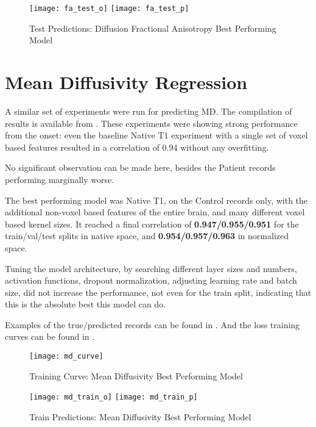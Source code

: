 \begin{figure}[H]
\centering
\texttt{[image: fa\_test\_o]}
\texttt{[image: fa\_test\_p]}
\caption{Test Predictions: Diffusion Fractional Anisotropy Best Performing Model}
\label{fig:pred-tes-fa}
\end{figure}

\section{Mean Diffusivity Regression}

A similar set of experiments were run for predicting \ac{MD}. The compilation of results is available from  . These experiments were showing strong performance from the onset: even the baseline Native T1 experiment with a single set of voxel based features resulted in a correlation of 0.94 without any overfitting.\par
No significant observation can be made here, besides the Patient records performing marginally worse.\par
The best performing model was Native T1, on the Control records only, with the additional non-voxel based features of the entire brain, and many different voxel based kernel sizes. It reached a final correlation of \textbf{0.947/0.955/0.951} for the train/val/test splits in native space, and \textbf{0.954/0.957/0.963} in normalized space.\par
Tuning the model architecture, by searching different layer sizes and numbers, activation functions, dropout normalization, adjusting learning rate and batch size, did not increase the performance, not even for the train split, indicating that this is the absolute best this model can do.\par
Examples of the true/predicted records can be found in  . And the loss training curves can be found in .

\begin{figure}[H]
\centering
\texttt{[image: md\_curve]}
\caption{Training Curve: Mean Diffusivity Best Performing Model}
\label{fig:curve-md}
\end{figure}

\begin{figure}[H]
\centering
\texttt{[image: md\_train\_o]}
\texttt{[image: md\_train\_p]}
\caption{Train Predictions: Mean Diffusivity Best Performing Model}
\label{fig:pred-tra-md}
\end{figure}

